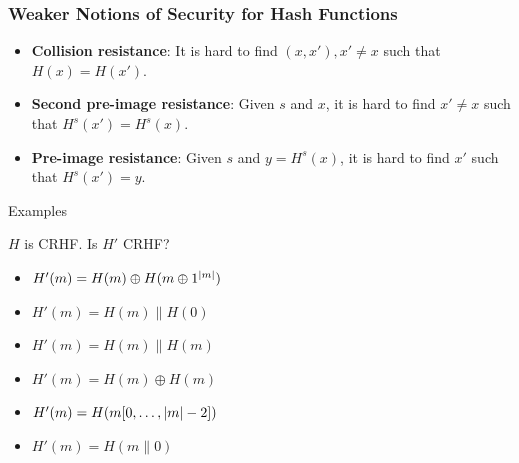 \begin{frame}\frametitle{Weaker Notions of Security for Hash Functions}
\begin{figure}
\begin{center}

\end{center}
\end{figure}
\begin{itemize}
\item \textbf{Collision resistance}: It is hard to find $(x, x'), x' \ne x$ such that $H(x) = H(x')$.
\item \textbf{Second pre-image resistance}: Given $s$ and $x$, it is hard to find $x' \ne x$ such that $H^s(x') = H^s(x)$.
\item \textbf{Pre-image resistance}: Given $s$ and $y = H^s(x)$, it is hard to find $x'$ such that $H^s(x')=y$.
\end{itemize}
\end{frame}
\begin{frame}{Examples}
\begin{exampleblock}{$H$ is CRHF. Is $H'$ CRHF?}
\begin{itemize}
\item $H'(m) = H(m)\oplus H(m\oplus 1^{\lvert m\rvert})$ %
\item $H'(m) = H(m)\| H(0)$
\item $H'(m) = H(m)\| H(m)$
\item $H'(m) = H(m) \oplus H(m)$
\item $H'(m) = H(m[0,\dots,\lvert m\rvert-2])$
\item $H'(m) = H(m\| 0)$
\end{itemize}
\end{exampleblock}
\end{frame}
